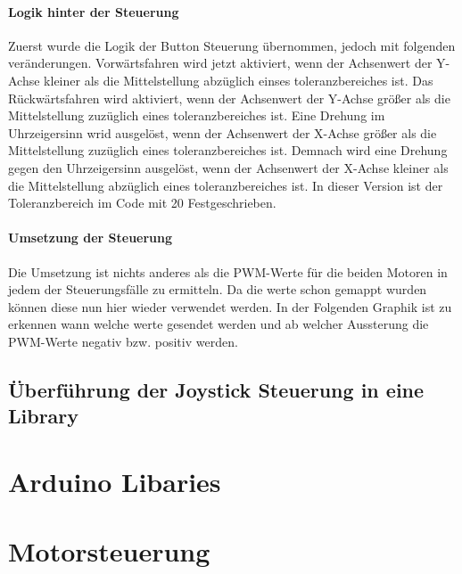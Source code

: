 \documentclass[12pt]{article}
\begin{document}
\paragraph{Logik hinter der Steuerung}
Zuerst wurde die Logik der Button Steuerung übernommen, jedoch mit folgenden veränderungen. 
Vorwärtsfahren wird jetzt aktiviert, wenn der Achsenwert der Y-Achse kleiner als die Mittelstellung abzüglich einses toleranzbereiches ist.
Das Rückwärtsfahren wird aktiviert, wenn der Achsenwert der Y-Achse größer als die Mittelstellung zuzüglich eines toleranzbereiches ist.
Eine Drehung im Uhrzeigersinn wrid ausgelöst, wenn der Achsenwert der X-Achse größer als die Mittelstellung zuzüglich eines toleranzbereiches ist. Demnach wird eine Drehung gegen den Uhrzeigersinn ausgelöst, wenn der Achsenwert der X-Achse kleiner als die Mittelstellung abzüglich eines toleranzbereiches ist.
In dieser Version ist der Toleranzbereich im Code mit 20 Festgeschrieben.
\paragraph{Umsetzung der Steuerung}
Die Umsetzung ist nichts anderes als die PWM-Werte für die beiden Motoren in jedem der Steuerungsfälle zu ermitteln. Da die werte schon gemappt wurden können diese nun hier wieder verwendet werden. In der Folgenden Graphik ist zu erkennen wann welche werte gesendet werden und ab welcher Aussterung die PWM-Werte negativ bzw. positiv werden.

\subsection{Überführung der Joystick Steuerung in eine Library} %

\newpage
\section{Arduino Libaries} %

\newpage
\section{Motorsteuerung} %

\newpage
\end{document}

